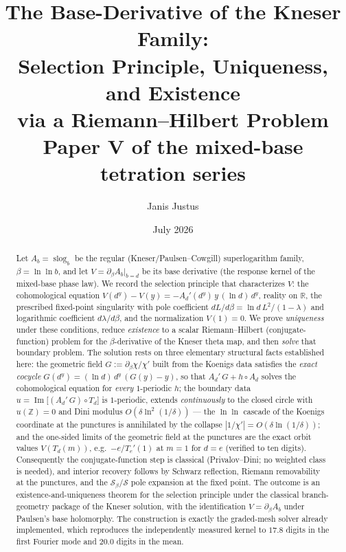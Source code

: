 \documentclass[11pt]{article}
\title{The Base-Derivative of the Kneser Family:\\
Selection Principle, Uniqueness, and Existence\\
via a Riemann--Hilbert Problem\\[2mm]
\large Paper V of the mixed-base tetration series}
\author{Janis Justus}
\date{July 2026}
\newcommand{\R}{\mathbb{R}}
\newcommand{\Z}{\mathbb{Z}}
\newcommand{\Sk}{\mathcal S}
\begin{document}
\maketitle

\begin{abstract}
Let $A_b=\operatorname{slog}_b$ be the regular (Kneser/Paulsen--Cowgill)
superlogarithm family, $\beta=\ln\ln b$, and let
$V=\partial_\beta A_b|_{b=d}$ be its base derivative (the response kernel
of the mixed-base phase law).  We record the selection principle that
characterizes $V$: the cohomological equation
$V(d^y)-V(y)=-A_d'(d^y)\,y\,(\ln d)\,d^y$, reality on $\R$, the prescribed
fixed-point singularity with pole coefficient $dL/d\beta=\ln d\,L^2/(1-\lambda)$
and logarithmic coefficient $d\lambda/d\beta$, and the normalization
$V(1)=0$.  We prove \emph{uniqueness} under these conditions, reduce
\emph{existence} to a scalar Riemann--Hilbert (conjugate-function) problem
for the $\beta$-derivative of the Kneser theta map, and then \emph{solve}
that boundary problem.  The solution rests on three elementary structural
facts established here: the geometric field $G:=\partial_\beta\chi/\chi'$
built from the Koenigs data satisfies the \emph{exact cocycle}
$G(d^y)=(\ln d)\,d^y\,(G(y)-y)$, so that $A_d'\,G+h\circ A_d$ solves the
cohomological equation for \emph{every} $1$-periodic $h$; the boundary
data $u=\operatorname{Im}\bigl[(A_d'\,G)\circ T_d\bigr]$ is $1$-periodic,
extends \emph{continuously} to the closed circle with $u(\Z)=0$ and Dini
modulus $O(\delta\ln^2(1/\delta))$ --- the $\ln\ln$ cascade of the Koenigs
coordinate at the punctures is annihilated by the collapse
$|1/\chi'|=O(\delta\ln(1/\delta))$; and the one-sided limits of the
geometric field at the punctures are the exact orbit values
$V(T_d(m))$, e.g.\ $-e/T_e'(1)$ at $m=1$ for $d=e$ (verified to ten
digits).  Consequently the conjugate-function step is classical
(Privalov--Dini; no weighted class is needed), and interior recovery
follows by Schwarz reflection, Riemann removability at the punctures, and
the $\Sk_\beta/\Sk$ pole expansion at the fixed point.  The outcome is an
existence-and-uniqueness theorem for the selection principle under the
classical branch-geometry package of the Kneser solution, with the
identification $V=\partial_\beta A_b$ under Paulsen's base holomorphy.
The construction is exactly the graded-mesh solver already implemented,
which reproduces the independently measured kernel to $17.8$ digits in
the first Fourier mode and $20.0$ digits in the mean.
\end{abstract}
\end{document}
